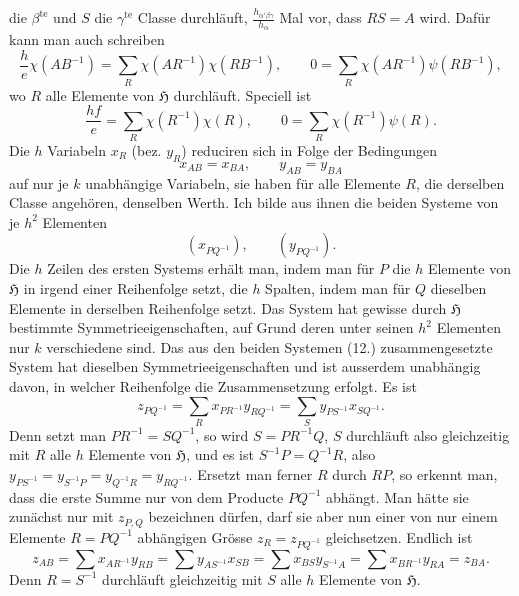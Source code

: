 \documentclass[11pt]{article}
\newcommand{\grp}{\mathfrak{H}}
\begin{document}
die $\beta^{\text{te}}$ und $S$ die $\gamma^{\text{te}}$ Classe durchläuft, $\frac{h_{\alpha'\beta\gamma}}{h_\alpha}$ Mal vor, dass $RS=A$ wird. Dafür kann man auch schreiben
\begin{equation*}\tag{9.}
\frac{h}{e}\chi(AB^{-1})=\sum_R\chi(AR^{-1})\chi(RB^{-1}),\qquad 0=\sum_R\chi(AR^{-1})\psi(RB^{-1}),
\end{equation*}
wo $R$ alle Elemente von $\grp$ durchläuft. Speciell ist
\begin{equation*}\tag{10.}
\frac{hf}{e}=\sum_R\chi(R^{-1})\chi(R),\qquad 0=\sum_R\chi(R^{-1})\psi(R).
\end{equation*}
Die $h$ Variabeln $x_R$ (bez. $y_R$) reduciren sich in Folge der Bedingungen
\begin{equation*}\tag{11.}
x_{AB}=x_{BA},\qquad y_{AB}=y_{BA}
\end{equation*}
auf nur je $k$ unabhängige Variabeln, sie haben für alle Elemente $R$, die derselben Classe angehören, denselben Werth. Ich bilde aus ihnen die beiden Systeme von je $h^2$ Elementen
\begin{equation*}\tag{12.}
(x_{PQ^{-1}}),\qquad (y_{PQ^{-1}}).
\end{equation*}
Die $h$ Zeilen des ersten Systems erhält man, indem man für $P$ die $h$ Elemente von $\grp$ in irgend einer Reihenfolge setzt, die $h$ Spalten, indem man für $Q$ dieselben Elemente in derselben Reihenfolge setzt. Das System hat gewisse durch $\grp$ bestimmte Symmetrieeigenschaften, auf Grund deren unter seinen $h^2$ Elementen nur $k$ verschiedene sind. Das aus den beiden Systemen (12.) zusammengesetzte System hat dieselben Symmetrieeigenschaften und ist ausserdem unabhängig davon, in welcher Reihenfolge die Zusammensetzung erfolgt. Es ist
\begin{equation*}\tag{13.}
z_{PQ^{-1}}=\sum_R x_{PR^{-1}}y_{RQ^{-1}}=\sum_S y_{PS^{-1}}x_{SQ^{-1}}.
\end{equation*}
Denn setzt man $PR^{-1}=SQ^{-1}$, so wird $S=PR^{-1}Q$, $S$ durchläuft also gleichzeitig mit $R$ alle $h$ Elemente von $\grp$, und es ist $S^{-1}P=Q^{-1}R$, also $y_{PS^{-1}}=y_{S^{-1}P}=y_{Q^{-1}R}=y_{RQ^{-1}}$. Ersetzt man ferner $R$ durch $RP$, so erkennt man, dass die erste Summe nur von dem Producte $PQ^{-1}$ abhängt. Man hätte sie zunächst nur mit $z_{P,Q}$ bezeichnen dürfen, darf sie aber nun einer von nur einem Elemente $R=PQ^{-1}$ abhängigen Grösse $z_R=z_{PQ^{-1}}$ gleichsetzen. Endlich ist
\[
z_{AB}=\sum x_{AR^{-1}}y_{RB}=\sum y_{AS^{-1}}x_{SB}=\sum x_{BS}y_{S^{-1}A}=\sum x_{BR^{-1}}y_{RA}=z_{BA}.
\]
Denn $R=S^{-1}$ durchläuft gleichzeitig mit $S$ alle $h$ Elemente von $\grp$.
\end{document}
